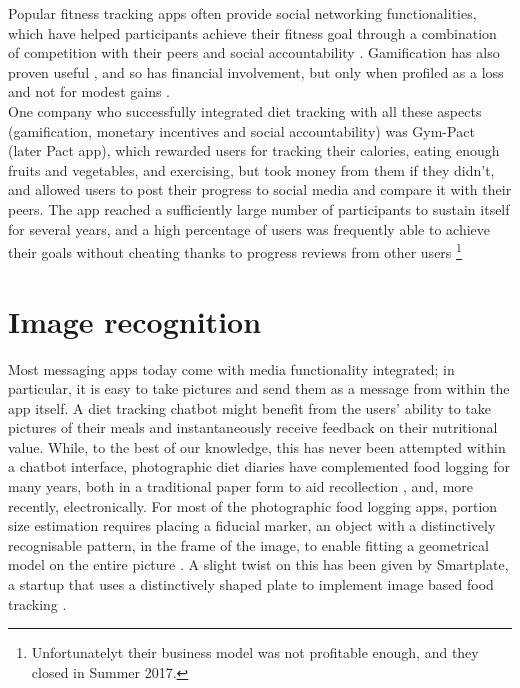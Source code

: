 Popular fitness tracking apps often provide social networking functionalities, which have helped participants achieve their fitness goal through a combination of competition with their peers and social accountability \cite{chenchen2014}. Gamification has also proven useful \cite{doi:10.1001/jamainternmed.2017.3458}, and so has financial involvement, but only when profiled as a loss and not for modest gains \cite{doi:10.7326/M15-1635}. \\
One company who successfully integrated diet tracking with all these aspects (gamification, monetary incentives and social accountability) was Gym-Pact (later Pact app), which rewarded users for tracking their calories, eating enough fruits and vegetables, and exercising, but took money from them if they didn't, and allowed users to post their progress to social media and compare it with their peers. The app reached a sufficiently large number of participants \cite{nudgingpracticioner} to sustain itself for several years, and a high percentage of users was frequently able to achieve their goals without cheating thanks to progress reviews from other users \footnote{Unfortunatelyt their business model was not profitable enough, and they closed in Summer 2017.}

\section{Image recognition}
Most messaging apps today come with media functionality integrated; in particular, it is easy to take pictures and send them as a message from within the app itself. A diet tracking chatbot might benefit from the users' ability to take pictures of their meals and instantaneously receive feedback on their nutritional value. While, to the best of our knowledge, this has never been attempted within a chatbot interface, photographic diet diaries have complemented food logging for many years, both in a traditional paper form to aid recollection \cite{Higgins2009}, and, more recently, electronically. For most of the photographic food logging apps, portion size estimation requires placing a fiducial marker, an object with a distinctively recognisable pattern, in the frame of the image, to enable fitting a geometrical model on the entire picture \cite{Ahmad2016}. A slight twist on this has been given by Smartplate, a startup that uses a distinctively shaped plate to implement image based food tracking \cite{smartplate}.

